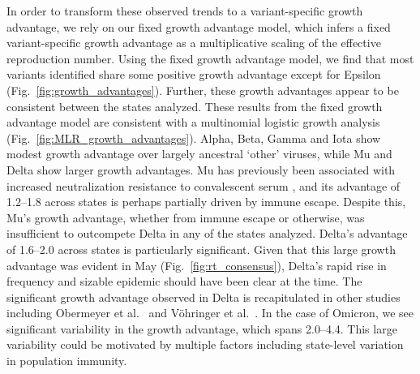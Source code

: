 In order to transform these observed trends to a variant-specific growth advantage, we rely on our fixed growth advantage model, which infers a fixed variant-specific growth advantage as a multiplicative scaling of the effective reproduction number.
Using the fixed growth advantage model, we find that most variants identified share some positive growth advantage except for Epsilon (Fig.\ \ref{fig:growth_advantages}).
Further, these growth advantages appear to be consistent between the states analyzed.
These results from the fixed growth advantage model are consistent with a multinomial logistic growth analysis (Fig.\ \ref{fig:MLR_growth_advantages}).
Alpha, Beta, Gamma and Iota show modest growth advantage over largely ancestral `other' viruses, while Mu and Delta show larger growth advantages.
Mu has previously been associated with increased neutralization resistance to convalescent serum \cite{Uriu2021}, and its advantage of 1.2--1.8 across states is perhaps partially driven by immune escape.
Despite this, Mu's growth advantage, whether from immune escape or otherwise, was insufficient to outcompete Delta in any of the states analyzed.
Delta's advantage of 1.6--2.0 across states is particularly significant.
Given that this large growth advantage was evident in May (Fig.\ \ref{fig:rt_consensus}), Delta's rapid rise in frequency and sizable epidemic should have been clear at the time.
The significant growth advantage observed in Delta is recapitulated in other studies including Obermeyer et al.\ \cite{obermeyer2022analysis} and V\"ohringer et al.\ \cite{vohringer2021genomic}.
In the case of Omicron, we see significant variability in the growth advantage, which spans 2.0--4.4.
This large variability could be motivated by multiple factors including state-level variation in population immunity.

